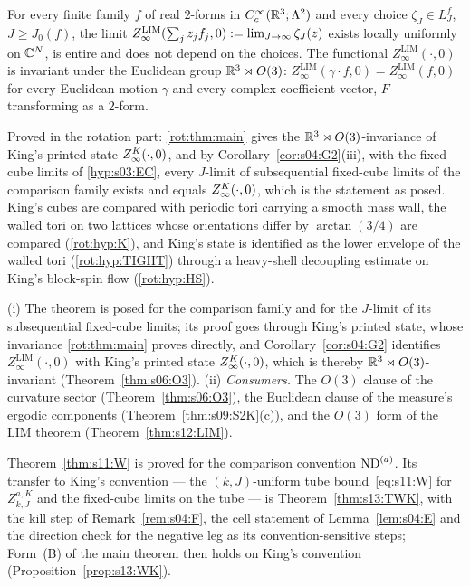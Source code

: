\begin{theorem}\label{hyp:s03:RC}
For every finite family $f$ of real $2$-forms in $C^\infty_c(\mathbb R^3;\Lambda^2)$ and every choice $\zeta_J\in L^f_J$, $J\ge J_0(f)$, the limit $Z^{\mathrm{LIM}}_\infty(\sum_jz_jf_j,0):=\lim_{J\to\infty}\zeta_J(z)$ exists locally uniformly on $\mathbb C^N$, is entire and does not depend on the choices. The functional $Z^{\mathrm{LIM}}_\infty(\cdot,0)$ is invariant under the Euclidean group $\mathbb R^3\rtimes O(3)$: $Z^{\mathrm{LIM}}_\infty(\gamma\cdot f,0)=Z^{\mathrm{LIM}}_\infty(f,0)$ for every Euclidean motion $\gamma$ and every complex coefficient vector, $F$ transforming as a $2$-form.
\end{theorem}
Proved in the rotation part: \cref{rot:thm:main} gives the $\mathbb R^3\rtimes O(3)$-invariance of King's printed state $Z^{K}_{\infty}(\cdot,0)$, and by Corollary~\ref{cor:s04:G2}(iii), with the fixed-cube limits of \cref{hyp:s03:EC}, every $J$-limit of subsequential fixed-cube limits of the comparison family exists and equals $Z^{K}_{\infty}(\cdot,0)$, which is the statement as posed. King's cubes are compared with periodic tori carrying a smooth mass wall, the walled tori on two lattices whose orientations differ by $\arctan(3/4)$ are compared (\cref{rot:hyp:K}), and King's state is identified as the lower envelope of the walled tori (\cref{rot:hyp:TIGHT}) through a heavy-shell decoupling estimate on King's block-spin flow (\cref{rot:hyp:HS}).

\begin{remark}\label{rem:s03:RC}
(i) The theorem is posed for the comparison family and for the $J$-limit of its subsequential fixed-cube limits; its proof goes through King's printed state, whose invariance \cref{rot:thm:main} proves directly, and Corollary~\ref{cor:s04:G2} identifies $Z^{\mathrm{LIM}}_\infty(\cdot,0)$ with King's printed state $Z^{K}_{\infty}(\cdot,0)$, which is thereby $\mathbb R^3\rtimes O(3)$-invariant (Theorem~\ref{thm:s06:O3}).
(ii) \emph{Consumers.} The $O(3)$ clause of the curvature sector (Theorem~\ref{thm:s06:O3}), the Euclidean clause of the measure's ergodic components (Theorem~\ref{thm:s09:S2K}(c)), and the $O(3)$ form of the LIM theorem (Theorem~\ref{thm:s12:LIM}).
\end{remark}

\begin{remark}\label{rem:s03:TWK}
Theorem~\ref{thm:s11:W} is proved for the comparison convention $\mathrm{ND}^{(a)}$. Its transfer to King's convention --- the $(k,J)$-uniform tube bound~\eqref{eq:s11:W} for $Z^{a,K}_{k,J}$ and the fixed-cube limits on the tube --- is Theorem~\ref{thm:s13:TWK}, with the kill step of Remark~\ref{rem:s04:F}, the cell statement of Lemma~\ref{lem:s04:E} and the direction check for the negative leg as its convention-sensitive steps; Form~(B) of the main theorem then holds on King's convention (Proposition~\ref{prop:s13:WK}).
\end{remark}

